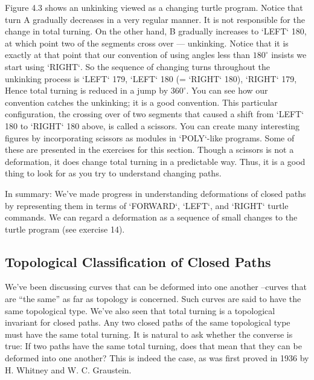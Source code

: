 \documentclass{book}
\begin{document}
Figure 4.3 shows an unkinking viewed as a changing turtle program.
Notice that turn A gradually decreases in a very regular manner. It is
not responsible for the change in total turning. On the other hand, B
gradually increases to \textsc{`LEFT`} 180, at which point two of the segments
cross over --- unkinking. Notice that it is exactly at that point that our
convention of using angles less than $180^{\circ}$ insists we start using \textsc{`RIGHT`}.
So the sequence of changing turns throughout the unkinking process is
\textsc{`LEFT`} 179, \textsc{`LEFT`} 180 (= \textsc{`RIGHT`} 180), \textsc{`RIGHT`} 179,
Hence total turning is reduced in a jump by $360^{\circ}$. You can see how
our convention catches the unkinking; it is a good convention. This
particular configuration, the crossing over of two segments that caused
a shift from \textsc{`LEFT`} 180 to \textsc{`RIGHT`} 180 above, is called a scissors. You can
create many interesting figures by incorporating scissors as modules in
\textsc{`POLY`}-like programs. Some of these are presented in the exercises for this
section. Though a scissors is not a deformation, it does change total
turning in a predictable way. Thus, it is a good thing to look for as you
try to understand changing paths.

In summary: We've made progress in understanding deformations of
closed paths by representing them in terms of \textsc{`FORWARD`}, \textsc{`LEFT`}, and \textsc{`RIGHT`}
turtle commands. We can regard a deformation as a sequence of small
changes to the turtle program (see exercise 14).

\subsection{Topological Classification of Closed Paths}

We've been discussing curves that can be deformed into one another --curves that are ``the same'' as far as topology is concerned. Such curves
are said to have the same topological type. We've also seen that total
turning is a topological invariant for closed paths. Any two closed paths
of the same topological type must have the same total turning. It is
natural to ask whether the converse is true: If two paths have the
same total turning, does that mean that they can be deformed into one
another? This is indeed the case, as was first proved in 1936 by H.
Whitney and W. C. Graustein.
\end{document}
